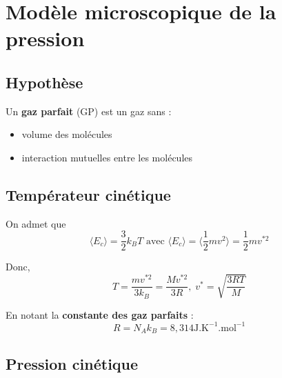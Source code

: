 \documentclass{report}
\begin{document}
\section{Modèle microscopique de la pression} %
\label{sec:Modèle microscopique de la pression}

\subsection{Hypothèse} %
\label{sub:Hypothèse}

Un \textbf{gaz parfait} (GP) est un gaz sans :
\begin{itemize}

    \item volume des molécules
    \item interaction mutuelles entre les molécules

\end{itemize}

\subsection{Températeur cinétique} %
\label{sub:Températeur cinétique}

On admet que 
\begin{equation}
  \langle E_c \rangle = \frac{3}{2} k_BT \text{ avec } \langle E_c \rangle = \langle \frac{1}{2} m v ^{2} \rangle = \frac{1}{2}  m v ^{*2}
\end{equation}

Donc, 
\begin{equation}
  \boxed{T = \frac{m v ^{*2}}{3 k_B} = \frac{M v ^{*2}}{3 R}, \; v ^{*} = \sqrt{\frac{3RT}{M} } }
\end{equation}

En notant la \textbf{constante des gaz parfaits} : 
\begin{equation}
  \boxed{R = N_A k_B = 8,314 \mathrm{J}. \mathrm{K} ^{-1}. \mathrm{mol} ^{-1}}
\end{equation}

\subsection{Pression cinétique} %
\end{document}
